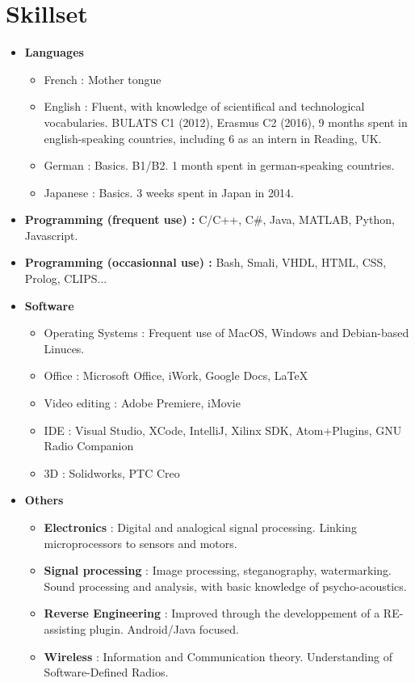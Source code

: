 \documentclass[11pt,a4paper,sans]{moderncv}        %
\begin{document}
\section{Skillset}

\vspace{6pt}

\begin{itemize}

\item \textbf{Languages} 
\begin{itemize}
\item French : Mother tongue
\item English : Fluent, with knowledge of scientifical and technological vocabularies. BULATS C1 (2012), Erasmus C2 (2016), 9 months spent in english-speaking countries, including 6 as an intern in Reading, UK.
\item German : Basics. B1/B2. 1 month spent in german-speaking countries.
\item Japanese : Basics. 3 weeks spent in Japan in 2014.
\end{itemize}

\vspace{6pt}

\item \textbf{Programming (frequent use) :} C/C++, C\#, Java, MATLAB, Python, Javascript.
\item \textbf{Programming (occasionnal use) :} Bash, Smali, VHDL, HTML, CSS, Prolog, CLIPS...

\vspace{6pt}

\item \textbf{Software}
\begin{itemize}
\item Operating Systems : Frequent use of MacOS, Windows and Debian-based Linuces.
\item Office : Microsoft Office, iWork, Google Docs, \LaTeX
\item Video editing : Adobe Premiere, iMovie
\item IDE : Visual Studio, XCode, IntelliJ, Xilinx SDK, Atom+Plugins, GNU Radio Companion
\item 3D : Solidworks, PTC Creo
\end{itemize}

\vspace{6pt}

\item \textbf{Others}
\begin{itemize}
\item \textbf{Electronics} : Digital and analogical signal processing. Linking microprocessors to sensors and motors.
\item \textbf{Signal processing} : Image processing, steganography, watermarking. Sound processing and analysis, with basic knowledge of psycho-acoustics.
\item \textbf{Reverse Engineering} : Improved through the developpement of a RE-assisting plugin. Android/Java focused.
\item \textbf{Wireless} : Information and Communication theory. Understanding of Software-Defined Radios.
\end{itemize}


\end{itemize}
\end{document}
